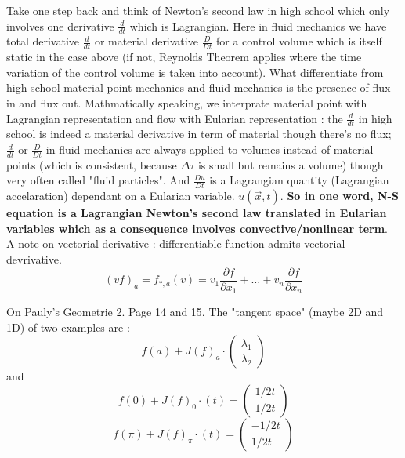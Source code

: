 \documentclass[a4paper,10pt]{article}
\begin{document}
Take one step back and think of Newton's second law in high school which only involves one derivative $\frac{d}{dt}$ which is Lagrangian. Here in fluid mechanics we have total derivative $\frac{d}{dt}$ or material derivative $\frac{D}{Dt}$ for a control volume which is itself static in the case above (if not, Reynolds Theorem applies where the time variation of the control volume is taken into account). What differentiate from high school material point mechanics and fluid mechanics is the presence of flux in and flux out. Mathmatically speaking, we interprate material point with Lagrangian representation and flow with Eularian representation : the $\frac{d}{dt}$ in high school is indeed a material derivative in term of material though there's no flux; $\frac{d}{dt}$ or $\frac{D}{Dt}$ in fluid mechanics are always applied to volumes instead of material points (which is consistent, because $\Delta \tau$ is small but remains a volume) though very often called "fluid particles". And $\frac{Du}{Dt}$ is a Lagrangian quantity (Lagrangian accelaration) dependant on a Eularian variable. $u(\vec{x},t)$. {\bf So in one word, N-S equation is a Lagrangian Newton's second law translated in Eularian variables which as a consequence involves convective/nonlinear term}.\\

A note on vectorial derivative : differentiable function admits vectorial devrivative. 
$$(vf)_a = f_{*,a}(v)=v_1 \frac{\partial f}{\partial x_1}+\dots + v_n \frac{\partial f}{\partial x_n}$$

On Pauly's Geometrie 2. Page 14 and 15. The "tangent space" (maybe 2D and 1D) of two examples are :
$$f(a) + J(f)_a \cdot \left(\begin{array}{c} \lambda_1 \\ \lambda_2 \end{array}\right)$$
and 
$$f(0) + J(f)_0 \cdot (t) = \left(\begin{array}{c} 1/2 t \\ 1/2 t \end{array}\right)$$
$$f(\pi) + J(f)_{\pi} \cdot (t) = \left(\begin{array}{c} -1/2 t \\ 1/2 t \end{array}\right)$$

\newpage


\end{document}
